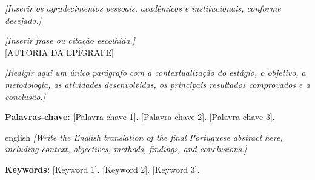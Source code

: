 \begin{agradecimentos}
  \noindent\textit{[Inserir os agradecimentos pessoais, acadêmicos e
  institucionais, conforme desejado.]}
\end{agradecimentos}
\cleardoublepage

\begin{epigrafe}
  \vspace*{\fill}
  \begin{flushright}
    \begin{minipage}{0.65\textwidth}
      \raggedleft
      \textit{[Inserir frase ou citação escolhida.]}\\[0.6em]
      [AUTORIA DA EPÍGRAFE]
    \end{minipage}
  \end{flushright}
  \vspace*{\fill}
\end{epigrafe}
\cleardoublepage

\begin{resumo}
  \noindent
  \textit{[Redigir aqui um único parágrafo com a contextualização do
  estágio, o objetivo, a metodologia, as atividades desenvolvidas,
  os principais resultados comprovados e a conclusão.]}

  \vspace{\onelineskip}
  \noindent\textbf{Palavras-chave:} [Palavra-chave 1].
  [Palavra-chave 2]. [Palavra-chave 3].
\end{resumo}
\cleardoublepage

\begin{resumo}[Abstract]
  \begin{otherlanguage*}{english}
    \noindent
    \textit{[Write the English translation of the final Portuguese
    abstract here, including context, objectives, methods, findings,
    and conclusions.]}

    \vspace{\onelineskip}
    \noindent\textbf{Keywords:} [Keyword 1]. [Keyword 2]. [Keyword 3].
  \end{otherlanguage*}
\end{resumo}
\cleardoublepage

